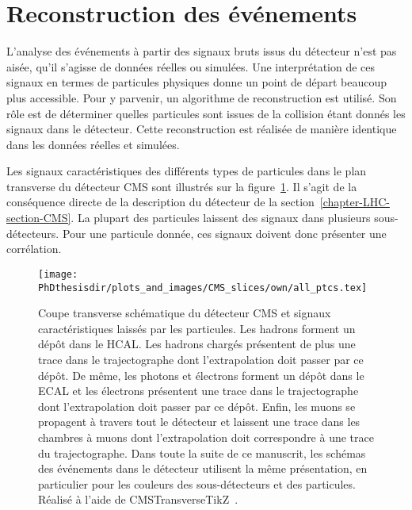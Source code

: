\section{Reconstruction des événements}\label{chapter-LHC-section-evt_reco}
L'analyse des événements à partir des signaux bruts issus du détecteur n'est pas aisée, qu'il s'agisse de données réelles ou simulées.
Une interprétation de ces signaux en termes de particules physiques donne un point de départ beaucoup plus accessible.
Pour y parvenir, un algorithme de reconstruction est utilisé.
Son rôle est de déterminer quelles particules sont issues de la collision étant donnés les signaux dans le détecteur.
Cette reconstruction est réalisée de manière identique dans les données réelles et simulées.
\par
Les signaux caractéristiques des différents types de particules dans le plan transverse du détecteur CMS sont illustrés sur la figure~\ref{fig-chapter-LHC-section-evt_reco-cms_slice}.
Il s'agit de la conséquence directe de la description du détecteur de la section~\ref{chapter-LHC-section-CMS}.
La plupart des particules laissent des signaux dans plusieurs sous-détecteurs.
Pour une particule donnée, ces signaux doivent donc présenter une corrélation.
\begin{figure}[b]
\texttt{[image: \\PhDthesisdir/plots\_and\_images/CMS\_slices/own/all\_ptcs.tex]}
\caption[Coupe transverse schématique du détecteur CMS.]{Coupe transverse schématique du détecteur CMS et signaux caractéristiques laissés par les particules. Les hadrons forment un dépôt dans le HCAL. Les hadrons chargés présentent de plus une trace dans le trajectographe dont l'extrapolation doit passer par ce dépôt. De même, les photons et électrons forment un dépôt dans le ECAL et les électrons présentent une trace dans le trajectographe dont l'extrapolation doit passer par ce dépôt. Enfin, les muons se propagent à travers tout le détecteur et laissent une trace dans les chambres à muons dont l'extrapolation doit correspondre à une trace du trajectographe. Dans toute la suite de ce manuscrit, les schémas des événements dans le détecteur utilisent la même présentation, en particulier pour les couleurs des sous-détecteurs et des particules. Réalisé à l'aide de CMSTransverseTikZ~\cite{CMSTransverseTikZ}.}
\label{fig-chapter-LHC-section-evt_reco-cms_slice}
\end{figure}
